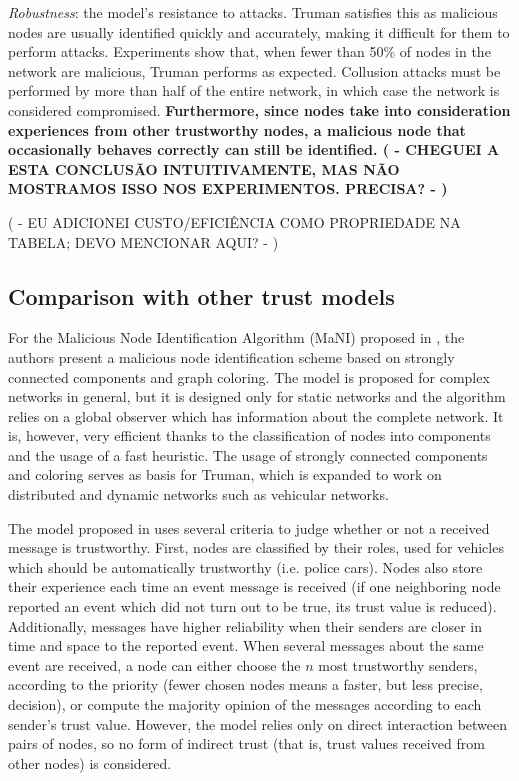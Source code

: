 \documentclass[conference]{IEEEtran}
\begin{document}
\textit{Robustness}: the model's resistance to attacks.
Truman satisfies this as malicious nodes are usually identified quickly and accurately, making it difficult for them to perform attacks.
Experiments show that, when fewer than 50\% of nodes in the network are malicious, Truman performs as expected.
Collusion attacks must be performed by more than half of the entire network, in which case the network is considered compromised.
\textbf{Furthermore, since nodes take into consideration experiences from other trustworthy nodes, a malicious node that occasionally behaves correctly can still be identified. ( - CHEGUEI A ESTA CONCLUSÃO INTUITIVAMENTE, MAS NÃO MOSTRAMOS ISSO NOS EXPERIMENTOS. PRECISA? - ) }

( - EU ADICIONEI CUSTO/EFICIÊNCIA COMO PROPRIEDADE NA TABELA; DEVO MENCIONAR AQUI? - )

\subsection{Comparison with other trust models}
\label{section:comparison}

For the Malicious Node Identification Algorithm (MaNI) proposed in \cite{vernize2015malicious}, the authors present a malicious node identification scheme based on strongly connected components and graph coloring.
The model is proposed for complex networks in general, but it is designed only for static networks and the algorithm relies on a global observer which has information about the complete network.
It is, however, very efficient thanks to the classification of nodes into components and the usage of a fast heuristic.
The usage of strongly connected components and coloring serves as basis for Truman, which is expanded to work on distributed and dynamic networks such as vehicular networks.

The model proposed in \cite{minhas2010towards} uses several criteria to judge whether or not a received message is trustworthy.
First, nodes are classified by their roles, used for vehicles which should be automatically trustworthy (i.e. police cars).
Nodes also store their experience each time an event message is received (if one neighboring node reported an event which did not turn out to be true, its trust value is reduced).
Additionally, messages have higher reliability when their senders are closer in time and space to the reported event.
When several messages about the same event are received, a node can either choose the $n$ most trustworthy senders, according to the priority (fewer chosen nodes means a faster, but less precise, decision), or compute the majority opinion of the messages according to each sender's trust value.
However, the model relies only on direct interaction between pairs of nodes, so no form of indirect trust (that is, trust values received from other nodes) is considered.
\end{document}
